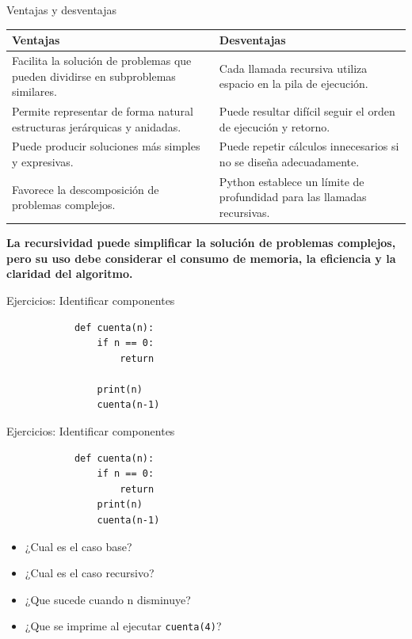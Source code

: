 \documentclass{beamer}
\begin{document}
    \begin{frame}{Ventajas y desventajas}
        \begin{center}
            \footnotesize
            \begin{tabular}{@{}p{5.2cm}p{5.2cm}@{}}
                \toprule
                \textbf{Ventajas} & \textbf{Desventajas} \\
                \midrule
                Facilita la solución de problemas que pueden dividirse en subproblemas similares. &
                Cada llamada recursiva utiliza espacio en la pila de ejecución. \\
                Permite representar de forma natural estructuras jerárquicas y anidadas. &
                Puede resultar difícil seguir el orden de ejecución y retorno. \\
                Puede producir soluciones más simples y expresivas. &
                Puede repetir cálculos innecesarios si no se diseña adecuadamente. \\
                Favorece la descomposición de problemas complejos. &
                Python establece un límite de profundidad para las llamadas recursivas. \\
                \bottomrule
            \end{tabular}
        \end{center}
        \vspace{0.6em}
        {\scriptsize\color{green!40!black}\textbf{La recursividad puede simplificar la solución de problemas
        complejos, pero su uso debe considerar el consumo de memoria, la eficiencia y la claridad del algoritmo.}}
    \end{frame}

    \begin{frame}[fragile, t]{Ejercicios: Identificar componentes}
        \begin{verbatim}
            def cuenta(n):
                if n == 0:
                    return

                print(n)
                cuenta(n-1)
        \end{verbatim}
    \end{frame}

    \begin{frame}[fragile, t]{Ejercicios: Identificar componentes}
        \begin{verbatim}
            def cuenta(n):
                if n == 0:
                    return
                print(n)
                cuenta(n-1)
        \end{verbatim}
        \begin{itemize}
            \item ¿Cual es el caso base?
            \item ¿Cual es el caso recursivo?
            \item ¿Que sucede cuando n disminuye?
            \item ¿Que se imprime al ejecutar \texttt{cuenta(4)}?
        \end{itemize}
    \end{frame}
\end{document}
